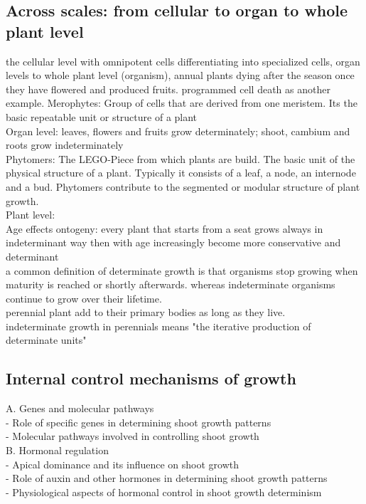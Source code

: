 \documentclass{article}
\begin{document}
\subsection*{Across scales: from cellular to organ to whole plant level}
the cellular level with omnipotent cells differentiating into specialized cells, organ levels to whole plant level (organism), annual plants dying after the season once they have flowered and produced fruits. programmed cell death as another example.
Merophytes: Group of cells that are derived from one meristem. Its the basic repeatable unit or structure of a plant\\
Organ level: leaves, flowers and fruits grow determinately; shoot, cambium and roots grow indeterminately\\
Phytomers: The LEGO-Piece from which plants are build. The basic unit of the physical structure of a plant. Typically it consists of a leaf, a node, an internode and a bud. Phytomers contribute to the segmented or modular structure of plant growth. \\
Plant level:\\
Age effects ontogeny: every plant that starts from a seat grows always in indeterminant way then with age increasingly become more conservative and determinant\\

a common definition of determinate growth is that organisms stop growing when maturity is reached or shortly afterwards. whereas indeterminate organisms continue to grow over their lifetime.\\
perennial plant add to their primary bodies as long as they live. \\
indeterminate growth in perennials means "the iterative production of determinate units"\\


\subsection*{Internal control mechanisms of growth}
A. Genes and molecular pathways\\
- Role of specific genes in determining shoot growth patterns\\
- Molecular pathways involved in controlling shoot growth \\

B. Hormonal regulation \\
- Apical dominance and its influence on shoot growth\\
- Role of auxin and other hormones in determining shoot growth patterns\\
- Physiological aspects of hormonal control in shoot growth determinism\\
\end{document}
